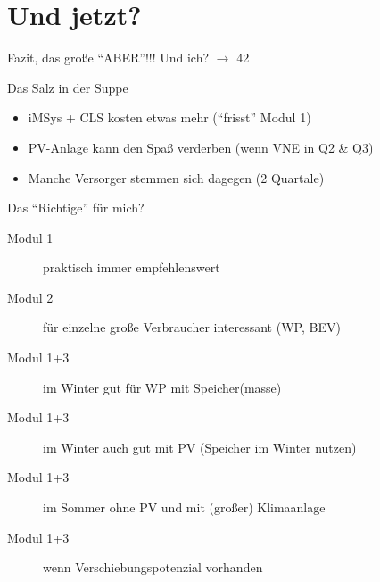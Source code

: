 \section{Und jetzt?}

\begin{frame}{Fazit, das große \enquote{ABER}!!! Und ich? $\rightarrow$ 42}
   \begin{block}{Das Salz in der Suppe}
       \begin{itemize}
           \item iMSys + CLS kosten etwas mehr (\enquote{frisst} Modul 1)
           \item PV-Anlage kann den Spaß verderben (wenn VNE in Q2 \& Q3)
           \item Manche Versorger stemmen sich dagegen (2 Quartale)
       \end{itemize}
   \end{block}

   \begin{block}{Das \enquote{Richtige} für mich?}
       \begin{description}
           \item[Modul 1] praktisch immer empfehlenswert
           \item[Modul 2] für einzelne große Verbraucher interessant (WP, BEV)
           \item[Modul 1+3] im Winter gut für WP mit Speicher(masse)
           \item[Modul 1+3] im Winter auch gut mit PV (Speicher im Winter nutzen)
           \item[Modul 1+3] im Sommer ohne PV und mit (großer) Klimaanlage
           \item[Modul 1+3] wenn Verschiebungspotenzial vorhanden
       \end{description}
   \end{block}
   \vspace{0.3cm}
\end{frame}

